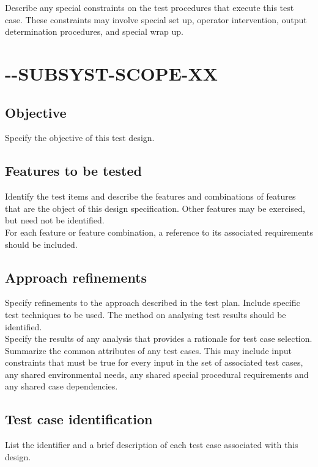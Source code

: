 \documentclass[CUx,lsstdraft,STS]{lsstdoc}
\begin{document}
Describe any special constraints on the test procedures that execute this test case. These constraints may involve special set
up, operator intervention, output determination procedures, and special wrap up.


\section{\CU-\product-SUBSYST-SCOPE-XX \label{sect:designid}}

\subsection{Objective \label{sect:designobj}}
Specify the objective of this test design.

\subsection{Features to be tested \label{sect:totest}}
Identify the test items and describe the features and combinations of features that are the object of this design
specification. Other features may be exercised, but need not be identified.\\
For each feature or feature combination, a reference to its associated requirements should be included.

\subsection{Approach refinements \label{sect:approach}}
Specify refinements to the approach described in the test plan. Include specific test techniques to be used.
The method on analysing test results should be identified.\\
Specify the results of any analysis that provides a rationale for test case selection.\\
Summarize the common attributes of any test cases. This may include input constraints that must be true for every input
in the set of associated test cases, any shared environmental needs, any shared special procedural requirements and any
shared case dependencies.

\subsection{Test case identification \label{sect:testcaselist}}
List the identifier and a brief description of each test case associated with this design.
\end{document}
